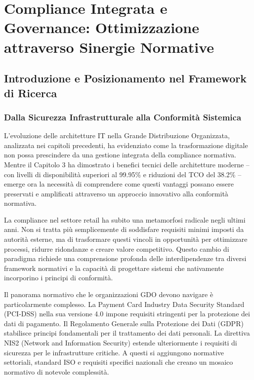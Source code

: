 \chapter{Compliance Integrata e Governance: Ottimizzazione attraverso Sinergie Normative}

\section{Introduzione e Posizionamento nel Framework di Ricerca}

\subsection{Dalla Sicurezza Infrastrutturale alla Conformità Sistemica}

L'evoluzione delle architetture IT nella Grande Distribuzione Organizzata, analizzata nei capitoli precedenti, ha evidenziato come la trasformazione digitale non possa prescindere da una gestione integrata della compliance normativa. Mentre il Capitolo 3 ha dimostrato i benefici tecnici delle architetture moderne -- con livelli di disponibilità superiori al 99.95\% e riduzioni del TCO del 38.2\% -- emerge ora la necessità di comprendere come questi vantaggi possano essere preservati e amplificati attraverso un approccio innovativo alla conformità normativa.

La compliance nel settore retail ha subito una metamorfosi radicale negli ultimi anni. Non si tratta più semplicemente di soddisfare requisiti minimi imposti da autorità esterne, ma di trasformare questi vincoli in opportunità per ottimizzare processi, ridurre ridondanze e creare valore competitivo. Questo cambio di paradigma richiede una comprensione profonda delle interdipendenze tra diversi framework normativi e la capacità di progettare sistemi che nativamente incorporino i principi di conformità.

Il panorama normativo che le organizzazioni GDO devono navigare è particolarmente complesso. La Payment Card Industry Data Security Standard (PCI-DSS) nella sua versione 4.0 impone requisiti stringenti per la protezione dei dati di pagamento. Il Regolamento Generale sulla Protezione dei Dati (GDPR) stabilisce principi fondamentali per il trattamento dei dati personali. La direttiva NIS2 (Network and Information Security) estende ulteriormente i requisiti di sicurezza per le infrastrutture critiche. A questi si aggiungono normative settoriali, standard ISO e requisiti specifici nazionali che creano un mosaico normativo di notevole complessità.

